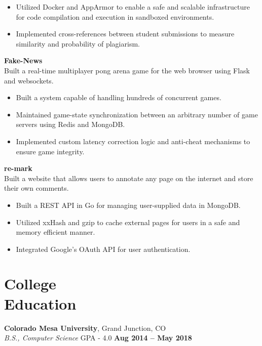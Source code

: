 \documentclass[margin,line]{resume}
\begin{document}
\begin{resume}
	\begin{itemize}
	\item Utilized Docker and AppArmor to enable a safe and scalable infrastructure for code
          compilation and execution in sandboxed environments.
    \item Implemented cross-references between student submissions to measure similarity and
          probability of plagiarism.
	\end{itemize}

    \textbf{Fake-News}\\
    Built a real-time multiplayer pong arena game for the web browser using Flask and
    websockets.

        \begin{itemize}
        \item Built a system capable of handling hundreds of concurrent games.
        \item Maintained game-state synchronization between an arbitrary number of
              game servers using Redis and MongoDB.
        \item Implemented custom latency correction logic and anti-cheat mechanisms
              to ensure game integrity.
	\end{itemize}


    \textbf{re-mark}\\
    Built a website that allows users to annotate any page on the internet
    and store their own comments.

        \begin{itemize}
        \item Built a REST API in Go for managing user-supplied data in MongoDB.
        \item Utilized xxHash and gzip to cache external pages for users in
              a safe and memory efficient manner.
        \item Integrated Google's OAuth API for user authentication.
        \end{itemize}

    \section{\mysidestyle College\\Education}

    \textbf{Colorado Mesa University}, Grand Junction, CO \vspace{2mm}\\\vspace{1mm}%
    \textsl{B.S., Computer Science} GPA - 4.0 \hfill \textbf{Aug 2014 -- May 2018}


\end{resume}
\end{document}
